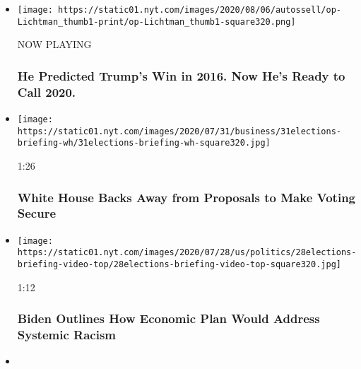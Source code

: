 \begin{itemize}
\item
  \texttt{[image: https://static01.nyt.com/images/2020/08/06/autossell/op-Lichtman\_thumb1-print/op-Lichtman\_thumb1-square320.png]}

  NOW PLAYING

  \hypertarget{he-predicted-trumps-win-in-2016-now-hes-ready-to-call-2020-2}{%
  \subsubsection{He Predicted Trump's Win in 2016. Now He's Ready to
  Call
  2020.}\label{he-predicted-trumps-win-in-2016-now-hes-ready-to-call-2020-2}}
\item
  \href{https://www.nytimes.com/video/us/100000007267362/white-house-mail-in-ballots-election.html?action=click\&module=video-series-bar\&region=header\&pgtype=Article\&playlistId=video/2020-Elections}{}

  \texttt{[image: https://static01.nyt.com/images/2020/07/31/business/31elections-briefing-wh/31elections-briefing-wh-square320.jpg]}

  1:26

  \hypertarget{white-house-backs-away-from-proposals-to-make-voting-secure}{%
  \subsubsection{White House Backs Away from Proposals to Make Voting
  Secure}\label{white-house-backs-away-from-proposals-to-make-voting-secure}}
\item
  \href{https://www.nytimes.com/video/us/politics/100000007260487/watch-live-biden-delivers-speech-on-systemic-racism.html?action=click\&module=video-series-bar\&region=header\&pgtype=Article\&playlistId=video/2020-Elections}{}

  \texttt{[image: https://static01.nyt.com/images/2020/07/28/us/politics/28elections-briefing-video-top/28elections-briefing-video-top-square320.jpg]}

  1:12

  \hypertarget{biden-outlines-how-economic-plan-would-address-systemic-racism}{%
  \subsubsection{Biden Outlines How Economic Plan Would Address Systemic
  Racism}\label{biden-outlines-how-economic-plan-would-address-systemic-racism}}
\item
  \href{https://www.nytimes.com/video/us/100000007251300/biden-trump-racist-divide-america.html?action=click\&module=video-series-bar\&region=header\&pgtype=Article\&playlistId=video/2020-Elections}{}


\end{itemize}
